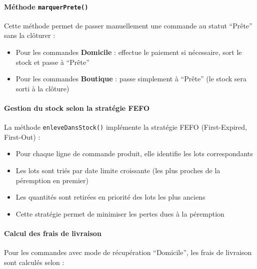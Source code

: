 \paragraph{Méthode \texttt{marquerPrete()}}

Cette méthode permet de passer manuellement une commande au statut ``Prête'' sans la clôturer :

\begin{itemize}
    \item Pour les commandes \textbf{Domicile} : effectue le paiement si nécessaire, sort le stock et passe à ``Prête''
    \item Pour les commandes \textbf{Boutique} : passe simplement à ``Prête'' (le stock sera sorti à la clôture)
\end{itemize}

\paragraph{Gestion du stock selon la stratégie FEFO}

La méthode \texttt{enleveDansStock()} implémente la stratégie FEFO (First-Expired, First-Out) :

\begin{itemize}
    \item Pour chaque ligne de commande produit, elle identifie les lots correspondants
    \item Les lots sont triés par date limite croissante (les plus proches de la péremption en premier)
    \item Les quantités sont retirées en priorité des lots les plus anciens
    \item Cette stratégie permet de minimiser les pertes dues à la péremption
\end{itemize}

\paragraph{Calcul des frais de livraison}

Pour les commandes avec mode de récupération ``Domicile'', les frais de livraison sont calculés selon :

